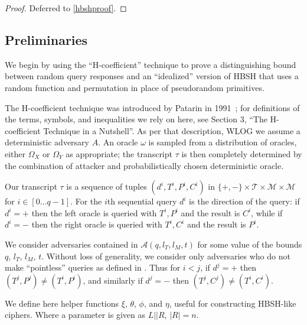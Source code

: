 \documentclass[eprint.tex]{subfiles}
\begin{document}
\begin{proof}Deferred to \autoref{hbshproof}.\renewcommand{\qedsymbol}{}
\end{proof}

\subsection{Preliminaries}
We begin by using the ``H-coefficient'' technique to prove a distinguishing bound
between random query responses and
an ``idealized'' version of HBSH that uses a random function and permutation
in place of pseudorandom primitives.

The H-coefficient technique was introduced by Patarin in 1991~\cite{ppdes,hco};
for definitions
of the terms, symbols, and inequalities we rely on here, see \cite{hco2} Section 3,
``The H-coefficient Technique in a Nutshell''.
As per that description, WLOG we assume a deterministic adversary $A$. An oracle $\omega$ is
sampled from a distribution of oracles, either $\Omega_X$ or
$\Omega_Y$ as appropriate; the transcript $\tau$ is then completely determined by the combination
of attacker and probabilistically chosen deterministic oracle.

Our transcript $\tau$ is a sequence of tuples
$(d^i, T^i, P^i, C^i)$
in
$\{+, -\} \times \mathcal{T} \times \mathcal{M} \times \mathcal{M}$
for $i \in [0 \ldots q-1]$.
For the $i$th sequential query
$d^i$ is the direction of the query:
if $d^i = +$ then the left oracle is queried with $T^i, P^i$ and the result is $C^i$,
while if $d^i = -$ then the right oracle is queried with $T^i, C^i$ and the result is $P^i$.

We consider adversaries contained in $\mathcal{A}(q, l_T, l_M, t)$ for some value of
the bounds $q$, $l_T$, $l_M$, $t$.
Without loss of generality, we consider only adversaries who do not make ``pointless''
queries as defined in \cite{cmc}. Thus for $i < j$, if $d^j = +$ then
$(T^j, P^j) \neq (T^i, P^i)$, and similarly if $d^j = -$ then
$(T^j, C^j) \neq (T^i, C^i)$.

We define here
helper functions $\xi$, $\theta$, $\phi$, and $\eta$, useful for constructing
HBSH-like ciphers. Where a parameter is given as
$L || R$, $|R|=n$.
\end{document}
